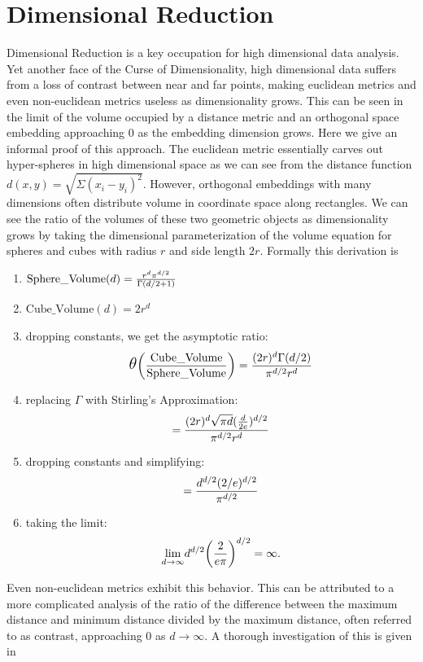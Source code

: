 \section{Dimensional Reduction}\label{rpprelim}

Dimensional Reduction is a key occupation for high dimensional data analysis.  Yet another face of the Curse of
Dimensionality, high dimensional data suffers from a loss of contrast between near and far points, making euclidean
metrics and even non-euclidean metrics useless as dimensionality grows.  This can be seen in the limit of the volume
occupied by a distance metric and an orthogonal space embedding approaching 0 as the embedding dimension grows.  Here we
give an informal proof of this approach.  The euclidean metric essentially carves out hyper-spheres in high dimensional
space as we can see from the distance function $d(x,y) = \sqrt{\Sigma(x_i-y_i)^2}$.  However, orthogonal embeddings with
many dimensions often distribute volume in coordinate space along rectangles.  We can see the ratio of the volumes of
these two geometric objects as dimensionality grows by taking the dimensional parameterization of the volume equation
for spheres and cubes with radius $r$ and side length $2r$.  Formally this derivation is

\begin{enumerate}\label{sphere2rect}
\item $ \text{Sphere\_Volume}(d) =  {{r^d\pi^{d/2}} \over {\Gamma(d/2+1)}}$
\item $\text{Cube\_Volume}(d) = 2r^d $
\item dropping constants, we get the asymptotic ratio:
$$
\mathlarger{\mathlarger{\theta}} \bigg({{\text{Cube\_Volume}} \over {\text{Sphere\_Volume}}}\bigg) =
{{(2r)^d \Gamma(d/2)} \over {\pi^{d/2}r^d}}
$$
\item replacing $\Gamma$  with Stirling's Approximation:
$$
= {   {  (2r)^d\sqrt{\pi d} ({{d}\over{2e}})^{d/2}   }\over {\pi^{d/2}r^d}  }
$$
\item dropping constants and simplifying:
$$
 = {{d^{d/2}(2/e)^{d/2}} \over {\pi^{d/2}}}
$$
\item taking the limit:
$$
\underset{d\rightarrow \infty} {\lim} { d^{d/2} \bigg({ {2}\over{e\pi}}\bigg)^{d/2}} = \infty.
$$
\end{enumerate}
\noindent
Even non-euclidean metrics exhibit this behavior.  This can be attributed to a more complicated analysis of the ratio of
the difference between the maximum distance and minimum distance divided by the maximum distance, often referred to as
contrast, approaching $0$ as $d\rightarrow \infty$.  A thorough investigation of this is given in \cite{zimek12,
  Aggarwal01, Beyer1999}

